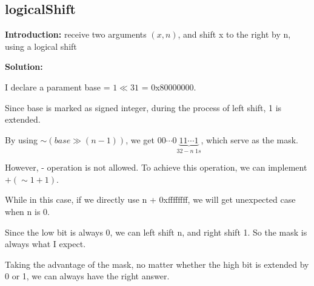 \documentclass[12pt,a4paper]{article}
\theoremstyle{definition}
\numberwithin{equation}{section}
\numberwithin{figure}{section}
\begin{document}
\begin{spacing}{1.5}
\subsection{logicalShift}
\textbf{Introduction: }receive two arguments $\left(x, n\right)$, and shift x to the right by n, using a logical shift\par
\textbf{Solution: }\par
I declare a parament base = $1 \ll 31$ = 0x80000000.\par
Since base is marked as signed integer, during the process of left shift, 1 is extended.\par
By using $\sim\left(base \gg \left(n-1\right)\right)$, we get $00\cdots0\underbrace{11\cdots1}_{32-n\;1s}$, which serve as the mask.\par
However, - operation is not allowed. To achieve this operation, we can implement $+\left(\sim 1 + 1\right)$.\par
While in this case, if we directly use n + 0xffffffff, we will get unexpected case when n is 0.\par
Since the low bit is always 0, we can left shift n, and right shift 1. So the mask is always what I expect.\par
Taking the advantage of the mask, no matter whether the high bit is extended by 0 or 1, we can always have the right answer.\par


\end{spacing}
\end{document}
